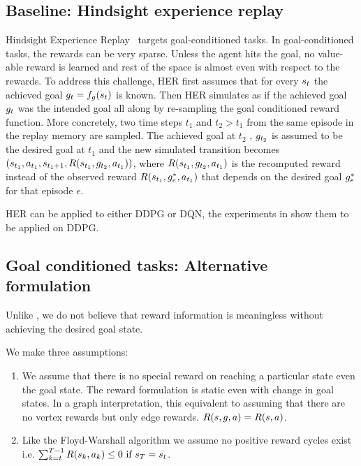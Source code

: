 \subsection{Baseline: Hindsight experience replay}
Hindsight Experience Replay~\cite{andrychowicz2016learning} targets
goal-conditioned tasks.
In goal-conditioned tasks, the rewards can be very sparse. Unless the agent hits
the goal, no value-able reward is learned and rest of the space is almost even
with respect to the rewards. To address this challenge, HER first assumes that
for every $s_t$ the achieved goal $g_t = f_g(s_t)$ is known.
Then HER simulates as if the achieved goal $g_t$ was the intended goal all
along by re-sampling the goal conditioned reward function.
More concretely, two time steps $t_1$ and $t_2 > t_1$ from the same episode in the replay memory are
sampled. The achieved goal at $t_2$ , $g_{t_2}$ is assumed to be the desired
goal at $t_1$ and the new simulated transition becomes $(s_{t_1},
a_{t_1}, s_{t_1 + 1}, R(s_{t_1}, g_{t_2}, a_{t_1}))$,
where $R(s_{t_1}, g_{t_2}, a_{t_1})$ is the recomputed reward
instead of the observed reward $R(s_{t_1}, g^*_{e}, a_{t_1})$ that
depends on the desired goal $g^*_{e}$ for that episode $e$.

HER can be applied to either DDPG or DQN, the experiments in
\citet{andrychowicz2016learning} show them to be applied on DDPG.

\subsection{Goal conditioned tasks: Alternative formulation}
Unlike \citet{andrychowicz2016learning}, we do not believe that reward
information is meaningless without achieving the desired goal state.

We make three assumptions:
\begin{enumerate}
\item We assume that there is no special reward
  on reaching a particular state even the goal state. The reward formulation is
  static even with change in goal states.
  In a graph interpretation, this equivalent to assuming that there are no
  vertex rewards but only edge rewards.
  $R(s, g, a) = R(s, a)$.
\item Like the Floyd-Warshall algorithm we assume no positive reward cycles
  exist i.e. $  \sum_{k=t}^{T-1} R(s_k, a_k) \le 0 \text{ if }s_T = s_t$.
\end{enumerate}

